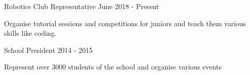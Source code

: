 

\begin{cventries}

  \projects
    {} %
    {Robotics Club Representative} %
    {June 2018 - Present} %
    {} %
    {
      \begin{por} %
        \item []{Organise tutorial sessions and competitions for juniors and teach them various skills like coding. }
      \end{por}
    }

\projects
    {} %
    {School President} %
    {2014 - 2015} %
    {} %
    {
      \begin{por} %
        \item []{Represent over 3000 students of the school and organise various events}
      \end{por}
    }

\end{cventries}
